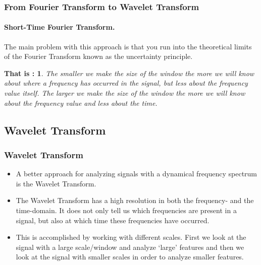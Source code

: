 \documentclass{beamer}
\newtheorem{thatis}{That is :}
\begin{document}
\begin{frame}
	\frametitle{From Fourier Transform to Wavelet Transform}
	\framesubtitle{Short-Time Fourier Transform.}
	The main problem with this approach is that you run into the theoretical limits of the Fourier Transform known as the uncertainty principle.
	\begin{thatis}
		The smaller we make the size of the window the more we will know about where a frequency has occurred in the signal, but less about the frequency value itself. The larger we make the size of the window the more we will know about the frequency value and less about the time.
	\end{thatis}
	
\end{frame}


\subsection{Wavelet Transform}
\begin{frame}
	\frametitle{Wavelet Transform}
	
	\begin{itemize}
		\item
		A better approach for analyzing signals with a dynamical frequency spectrum is the Wavelet Transform.
		\item
		The Wavelet Transform has a high resolution in both the frequency- and the time-domain. It does not only tell us which frequencies are present in a signal, but also at which time these frequencies have occurred.
		
		\item
		This is accomplished by working with different scales. First we look at the signal with a large scale/window and analyze ‘large’ features and then we look at the signal with smaller scales in order to analyze smaller features.
		
		
	\end{itemize}

\end{frame}
\end{document}
